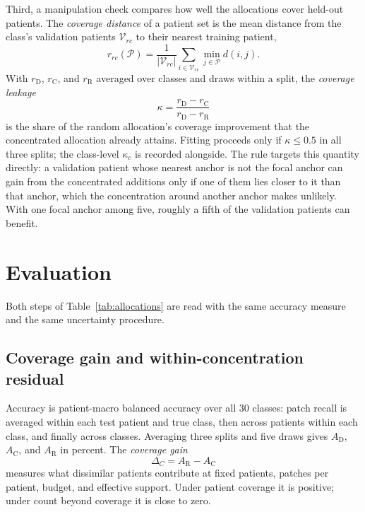 \documentclass[11pt]{article}
\begin{document}
Third, a manipulation check compares how well the allocations cover held-out patients. The \emph{coverage distance} of a patient set is the mean distance from the class's validation patients $\mathcal V_{rc}$ to their nearest training patient,
\begin{equation}
 r_{rc}(\mathcal P)=\frac{1}{|\mathcal V_{rc}|}\sum_{i\in\mathcal V_{rc}}\min_{j\in\mathcal P}d(i,j).
 \label{eq:coverage}
\end{equation}
\noindent With $r_{\mathrm D}$, $r_{\mathrm C}$, and $r_{\mathrm R}$ averaged over classes and draws within a split, the \emph{coverage leakage}
\begin{equation}
 \kappa=\frac{r_{\mathrm D}-r_{\mathrm C}}{r_{\mathrm D}-r_{\mathrm R}}
 \label{eq:leakage}
\end{equation}
\noindent is the share of the random allocation's coverage improvement that the concentrated allocation already attains. Fitting proceeds only if $\kappa\le 0.5$ in all three splits; the class-level $\kappa_c$ is recorded alongside. The rule targets this quantity directly: a validation patient whose nearest anchor is not the focal anchor can gain from the concentrated additions only if one of them lies closer to it than that anchor, which the concentration around another anchor makes unlikely. With one focal anchor among five, roughly a fifth of the validation patients can benefit.

\section{Evaluation}
\label{sec:evaluation}
Both steps of Table~\ref{tab:allocations} are read with the same accuracy measure and the same uncertainty procedure.

\subsection{Coverage gain and within-concentration residual}
\label{sec:contrasts}
Accuracy is patient-macro balanced accuracy over all 30 classes: patch recall is averaged within each test patient and true class, then across patients within each class, and finally across classes. Averaging three splits and five draws gives $A_{\mathrm D}$, $A_{\mathrm C}$, and $A_{\mathrm R}$ in percent. The \emph{coverage gain}
\begin{equation}
 \Delta_C=A_{\mathrm R}-A_{\mathrm C}
 \label{eq:coverage-gain}
\end{equation}
\noindent measures what dissimilar patients contribute at fixed patients, patches per patient, budget, and effective support. Under patient coverage it is positive; under count beyond coverage it is close to zero.
\end{document}
